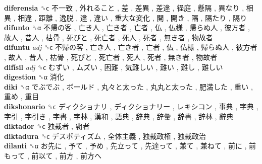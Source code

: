 \textbf{diferensia} ␝ϲ   不一致 ,  外れること ,  差 ,  差異 ,  差違 ,  径庭 ,  懸隔 ,  異なり ,  相異 ,  相違 ,  距離 ,  逸脱 ,  違 ,  違い ,  重大な変化 ,  開 ,  開き ,  隔 ,  隔たり ,  隔り   \\
\textbf{difunto} ␝α   不帰の客 ,  亡き人 ,  亡き者 ,  亡者 ,  仏 ,  仏様 ,  帰らぬ人 ,  彼方者 ,  故人 ,  昔人 ,  枯骨 ,  死びと ,  死亡者 ,  死人 ,  死者 ,  無き者 ,  物故者   \\
\textbf{difuntu} \emph{adj}  ␝ϲ   不帰の客 ,  亡き人 ,  亡き者 ,  亡者 ,  仏 ,  仏様 ,  帰らぬ人 ,  彼方者 ,  故人 ,  昔人 ,  枯骨 ,  死びと ,  死亡者 ,  死人 ,  死者 ,  無き者 ,  物故者   \\
\textbf{difísil} \emph{adj}  ␝ϲ   むずい ,  ムズい ,  困難 ,  気難しい ,  難い ,  難し ,  難しい   \\
\textbf{digestion} ␝α   消化   \\
\textbf{diki} ␝α   でぶでぶ ,  ボールド ,  丸々と太った ,  丸丸と太った ,  肥満した ,  重い ,  重め ,  重目   \\
\textbf{dikshonario} ␝ϲ   ディクショナリ ,  ディクショナリー ,  レキシコン ,  事典 ,  字典 ,  字引 ,  字引き ,  字書 ,  字林 ,  漢和 ,  語典 ,  辞典 ,  辞彙 ,  辞書 ,  辞林 ,  辭典   \\
\textbf{diktador} ␝ϲ   独裁者 ,  覇者   \\
\textbf{diktadura} ␝ϲ   デスポティズム ,  全体主義 ,  独裁政権 ,  独裁政治   \\
\textbf{dilanti} ␝α   お先に ,  予て ,  予め ,  先立って ,  先達って ,  兼て ,  兼ねて ,  前に ,  前もって ,  前以て ,  前方 ,  前方へ   \\
